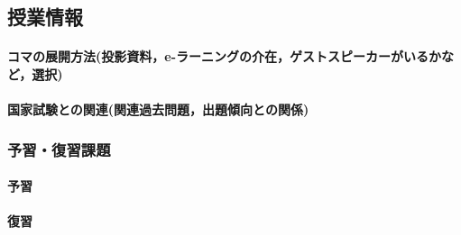 \subsection{授業情報}
\paragraph{コマの展開方法(投影資料，e-ラーニングの介在，ゲストスピーカーがいるかなど，選択)}
\paragraph{国家試験との関連(関連過去問題，出題傾向との関係)}
\subsubsection{予習・復習課題}
\paragraph{予習}

\paragraph{復習}
